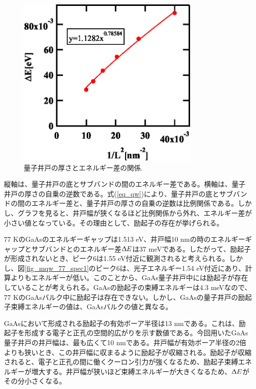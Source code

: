 \documentclass[11pt,a4j]{jsarticle}
\begin{document}
\begin{enumerate}
       \begin{figure}[ht]
        \centering
        \includegraphics[clip,width=9cm]{start2_MQW_77K_wellLength.eps}
        \caption{量子井戸の厚さとエネルギー差の関係.}
        \label{fig_mqw_77_welllength1}
       \end{figure}

       縦軸は、量子井戸の底とサブバンドの間のエネルギー差である。横軸は、量子井戸の厚さの自乗の逆数である。式(\ref{eq_qw})により、量子井戸の底とサブバンドの間のエネルギー差と、量子井戸の厚さの自乗の逆数は比例関係である。しかし、グラフを見ると、井戸幅が狭くなるほど比例関係から外れ、エネルギー差が小さい値となっている。その理由として、励起子の存在が挙げられる。

       77 KのGaAsのエネルギーギャップは1.513 eV、井戸幅10 nmの時のエネルギーギャップとサブバンドとのエネルギー差$\Updelta E$は37 meVである。したがって、励起子が形成されないとき、ピーク6は1.55 eV付近に観測されると考えられる。しかし、図\ref{fig_mqw_77_spec1}のピーク6は、光子エネルギー1.54 eV付近にあり、計算よりもエネルギーが低い。このことから、GaAs量子井戸中には励起子が存在していることが考えられる。GaAsの励起子の束縛エネルギーは4.3 meVなので、77 KのGaAsバルク中に励起子は存在できない。しかし、GaAsの量子井戸の励起子束縛エネルギーの値は、GaAsバルクの値と異なる。

       GaAsにおいて形成される励起子の有効ボーア半径は13 nmである\cite{exciton}。これは、励起子を形成する電子と正孔の空間的広がりを示す数値である。今回用いたGaAs量子井戸の井戸幅は、最も広くて10 nmである。井戸幅が有効ボーア半径の2倍よりも狭いとき、この井戸幅に収まるように励起子が収縮される。励起子が収縮されると、電子と正孔の間に働くクーロン引力が強くなるため、励起子束縛エネルギーが増大する。井戸幅が狭いほど束縛エネルギーが大きくなるため、$\Updelta E$がその分小さくなる。


\end{enumerate}
\end{document}

